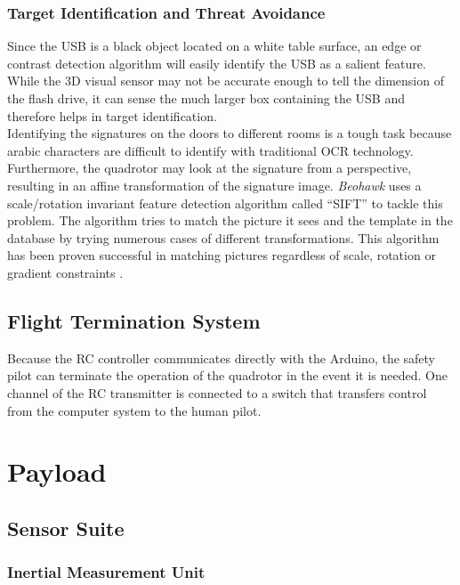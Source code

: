 \documentclass[12pt, letterpaper]{article}
\begin{document}
\subsubsection{Target Identification and Threat Avoidance}

Since the USB is a black object located on a white table surface, an edge or contrast detection algorithm will easily identify the USB as a salient feature. While the 3D visual sensor may not be accurate enough to tell the dimension of the flash drive, it can sense the much larger box containing the USB and therefore helps in target identification. 
\vspace{1.0em}\\
Identifying the signatures on the doors to different rooms is a tough task because arabic characters are difficult to identify with traditional OCR technology.  Furthermore, the quadrotor may look at the signature from a perspective, resulting in an affine transformation of the signature image. \textit{Beohawk} uses a scale/rotation invariant feature detection algorithm called ``SIFT'' to tackle this problem. The algorithm tries to match the picture it sees and the template in the database by trying numerous cases of different transformations. This algorithm has been proven successful in matching pictures regardless of scale, rotation or gradient constraints \cite{bib:sift}.

\subsection{Flight Termination System}
Because the RC controller communicates directly with the Arduino, the safety pilot can terminate the operation of the quadrotor in the event it is needed. One channel of the RC transmitter is connected to a switch that transfers control from the computer system to the human pilot.


\section{Payload}
\subsection{Sensor Suite}

\subsubsection{Inertial Measurement Unit}
\end{document}
